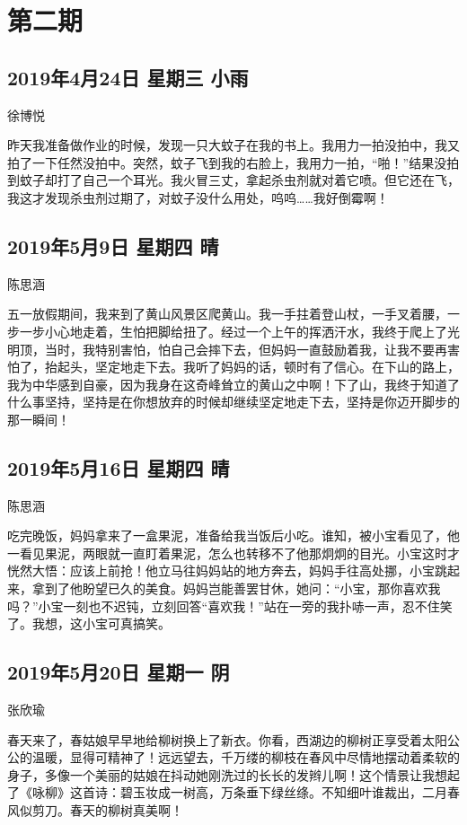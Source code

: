 \chapter{第二期}

\section{2019年4月24日 星期三 小雨}

徐博悦

昨天我准备做作业的时候，发现一只大蚊子在我的书上。我用力一拍没拍中，我又拍了一下任然没拍中。突然，蚊子飞到我的右脸上，我用力一拍，``啪！''结果没拍到蚊子却打了自己一个耳光。我火冒三丈，拿起杀虫剂就对着它喷。但它还在飞，我这才发现杀虫剂过期了，对蚊子没什么用处，呜呜\ldots{}\ldots{}我好倒霉啊！

\section{2019年5月9日 星期四 晴}

陈思涵

五一放假期间，我来到了黄山风景区爬黄山。我一手拄着登山杖，一手叉着腰，一步一步小心地走着，生怕把脚给扭了。经过一个上午的挥洒汗水，我终于爬上了光明顶，当时，我特别害怕，怕自己会摔下去，但妈妈一直鼓励着我，让我不要再害怕了，抬起头，坚定地走下去。我听了妈妈的话，顿时有了信心。在下山的路上，我为中华感到自豪，因为我身在这奇峰耸立的黄山之中啊！下了山，我终于知道了什么事坚持，坚持是在你想放弃的时候却继续坚定地走下去，坚持是你迈开脚步的那一瞬间！

\section{2019年5月16日 星期四 晴}

陈思涵

吃完晚饭，妈妈拿来了一盒果泥，准备给我当饭后小吃。谁知，被小宝看见了，他一看见果泥，两眼就一直盯着果泥，怎么也转移不了他那炯炯的目光。小宝这时才恍然大悟：应该上前抢！他立马往妈妈站的地方奔去，妈妈手往高处挪，小宝跳起来，拿到了他盼望已久的美食。妈妈岂能善罢甘休，她问：``小宝，那你喜欢我吗？''小宝一刻也不迟钝，立刻回答``喜欢我！''站在一旁的我扑哧一声，忍不住笑了。我想，这小宝可真搞笑。

\section{2019年5月20日 星期一 阴}

张欣瑜

春天来了，春姑娘早早地给柳树换上了新衣。你看，西湖边的柳树正享受着太阳公公的温暖，显得可精神了！远远望去，千万缕的柳枝在春风中尽情地摆动着柔软的身子，多像一个美丽的姑娘在抖动她刚洗过的长长的发辫儿啊！这个情景让我想起了《咏柳》这首诗：碧玉妆成一树高，万条垂下绿丝绦。不知细叶谁裁出，二月春风似剪刀。春天的柳树真美啊！

